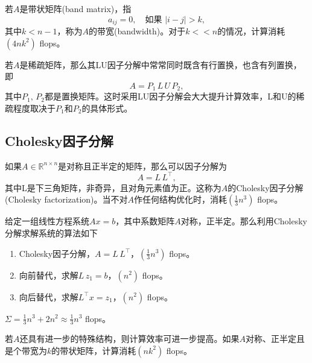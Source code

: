 若$A$是带状矩阵(band matrix)，指
\begin{equation}
  \label{eq:numlin-band-matrix-def}
  a_{ij} = 0, \quad \text{如果 } \left| i - j \right| > k,
\end{equation}
其中$k < n-1$，称为$A$的带宽(bandwidth)。对于$k << n$的情况，计算消耗$\left( 4 n k^{2} \right)$ flops。

若$A$是稀疏矩阵，那么其LU因子分解中常常同时既含有行置换，也含有列置换，即
\begin{equation*}
  A = P_{1} \, L \, U \, P_{2},
\end{equation*}
其中$P_{1}, \, P_{2}$都是置换矩阵。这时采用LU因子分解会大大提升计算效率，L和U的稀疏程度取决于$P_{1}$和$P_{2}$的具体形式。

\subsection{Cholesky因子分解}
\label{sec:numlin-factorization-cholesky}
如果$A \in \mathbb{R}^{n \times n}$是对称且正半定的矩阵，那么可以因子分解为
\begin{equation}
  \label{eq:numlin-factorization-cholesky}
  A = L \, L^{\top},
\end{equation}
其中L是下三角矩阵，非奇异，且对角元素值为正。这称为$A$的Cholesky因子分解(Cholesky factorization)。当不对$A$作任何结构优化时，消耗$ \left( \frac{1}{3} n^{3} \right)$ flops。

\begin{algorithm}[利用Cholesky分解求解正定线性方程系统]
  \label{algorithm:numlin-factorization-cholesky}
给定一组线性方程系统$A x = b$，其中系数矩阵$A$对称，正半定。那么利用Cholesky分解求解系统的算法如下
\begin{enumerate}
  \item Cholesky因子分解，$A = L \, L^{\top}$，$\left( \frac{1}{3} n^{3} \right)$ flops。
  \item 向前替代，求解$L \, z_{1} = b$，$\left( n^{2} \right)$ flops。
  \item 向后替代，求解$L^{\top} x = z_{1}$，$\left( n^{2} \right)$ flops。
\end{enumerate}
$\Sigma = \frac{1}{3} n^{3} + 2 n^{2} \approx \frac{1}{3} n^{3}$ flops。
\end{algorithm}

若$A$还具有进一步的特殊结构，则计算效率可进一步提高。如果$A$对称、正半定且是个带宽为$k$的带状矩阵，计算消耗$\left(n k^{2} \right)$ flops。

